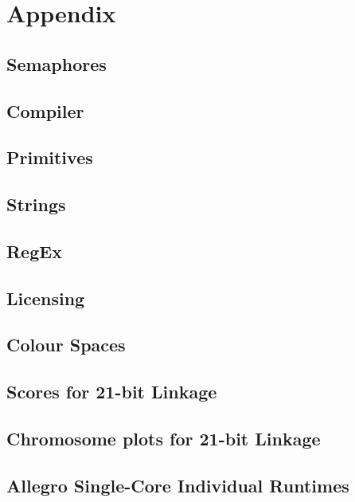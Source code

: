 \chapter{Appendix}

\section{Semaphores}\label{ref:app:semaphores}

\section{Compiler}\label{ref:app:compiler}

\section{Primitives}\label{ref:app:primitives}

\section{Strings}\label{ref:app:strings}

\section{RegEx}\label{ref:app:regex}

\section{Licensing}\label{ref:app:licensing}

\section{Colour Spaces}\label{ref:app:colour}

\section{Scores for 21-bit Linkage}\label{ref:app:21bitscores}

\section{Chromosome plots for 21-bit Linkage}\label{ref:app:21bitplots}

\section{Allegro Single-Core Individual Runtimes}\label{ref:app:singlecoreindiv}